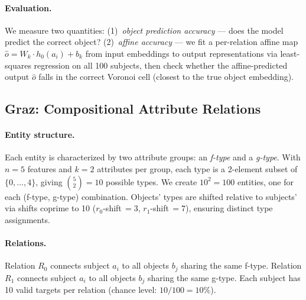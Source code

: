 \documentclass[11pt]{article}
\begin{document}
\paragraph{Evaluation.}
We measure two quantities: (1)~\emph{object prediction accuracy} --- does the model
predict the correct object? (2)~\emph{affine accuracy} --- we fit a per-relation affine
map $\hat{o} = W_k \cdot h_0(a_i) + b_k$ from input embeddings to output representations
via least-squares regression on all 100 subjects, then check whether the affine-predicted
output $\hat{o}$ falls in the correct Voronoi cell (closest to the true object embedding).

\subsection{Graz: Compositional Attribute Relations}

\paragraph{Entity structure.}
Each entity is characterized by two attribute groups: an \emph{f-type} and a
\emph{g-type}. With $n=5$ features and $k=2$ attributes per group, each type is a
2-element subset of $\{0,\ldots,4\}$, giving $\binom{5}{2} = 10$ possible types. We
create $10^2 = 100$ entities, one for each (f-type, g-type) combination. Objects' types
are shifted relative to subjects' via shifts coprime to 10 ($r_0$-shift$\,=3$,
$r_1$-shift$\,=7$), ensuring distinct type assignments.

\paragraph{Relations.}
Relation $R_0$ connects subject $a_i$ to all objects $b_j$ sharing the same f-type.
Relation $R_1$ connects subject $a_i$ to all objects $b_j$ sharing the same g-type.
Each subject has 10 valid targets per relation (chance level: $10/100 = 10\%$).
\end{document}
